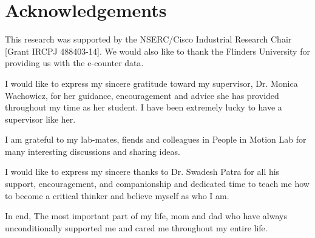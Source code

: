 \chapter*{Acknowledgements}

This research was supported by the NSERC/Cisco Industrial Research Chair [Grant IRCPJ 488403-14]. We would also like to thank the Flinders University for providing us with the e-counter data.

I would like to express my sincere gratitude toward my supervisor, Dr. Monica Wachowicz, for her guidance, encouragement and advice she has provided throughout my time as her student. I have been extremely lucky to have a supervisor like her.


I am  grateful to my lab-mates, fiends and colleagues in People in Motion Lab for many interesting discussions and sharing ideas. 

I would like to express my sincere thanks to Dr. Swadesh Patra for all his support, encouragement, and companionship and dedicated time to teach me how to become a critical thinker and believe myself as who I am.  

In end, The most important part of my life, mom and dad who have always unconditionally supported me and cared me throughout my entire life.